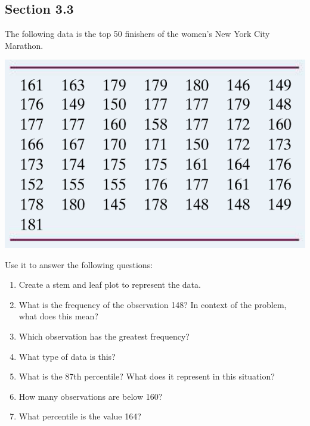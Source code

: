 \documentclass[12pt]{scrartcl}
\theoremstyle{definition}
\begin{document}
\subsection*{Section 3.3}
The following data is the top 50 finishers of the women's New York City Marathon.
\begin{center}
	\includegraphics[scale=0.5]{ReviewSec33}
\end{center}
Use it to answer the following questions:
\begin{enumerate}
	\item Create a stem and leaf plot to represent the data.
	\item What is the frequency of the observation 148? In context of the problem, what does this mean?
	\item Which observation has the greatest frequency?
	\item What type of data is this?
	\item What is the 87th percentile? What does it represent in this situation?
	\item How many observations are below 160?
	\item What percentile is the value 164?
\end{enumerate}
\end{document}
